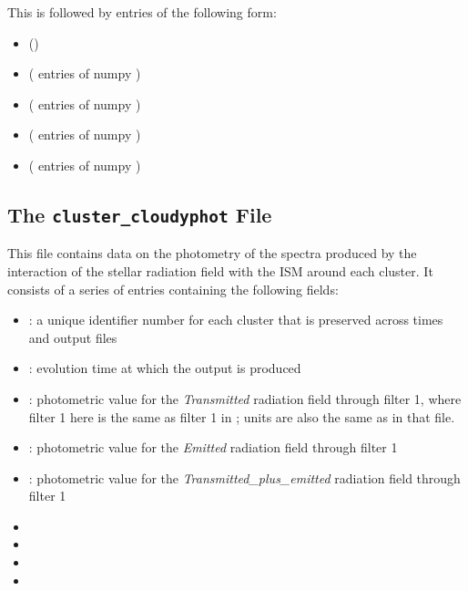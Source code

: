 \documentclass[letterpaper,10pt,english]{sphinxmanual}
\begin{document}
This is followed by  entries of the following form:
\begin{itemize}
\item {} 
 ()

\item {} 
 ( entries of numpy )

\item {} 
 ( entries of numpy )

\item {} 
 ( entries of numpy )

\item {} 
 ( entries of numpy
)

\end{itemize}


\subsection{The \texttt{cluster\_cloudyphot} File}
\label{cloudy:the-cluster-cloudyphot-file}
This file contains data on the photometry of the spectra produced by
the interaction of the stellar radiation field with the ISM around
each cluster. It consists of a series of entries containing the
following fields:
\begin{itemize}
\item {} 
: a unique identifier number for each cluster that is
preserved across times and output files

\item {} 
: evolution time at which the output is produced

\item {} 
: photometric value for the \emph{Transmitted}
radiation field through filter 1, where filter 1 here is the same as
filter 1 in {\hyperref[output:ssec-int-phot-file]{\emph{}}}; units are also the same as
in that file.

\item {} 
: photometric value for the \emph{Emitted}
radiation field through filter 1

\item {} 
: photometric value for the
\emph{Transmitted\_plus\_emitted} radiation field through filter 1

\item {} 

\item {} 

\item {} 

\item {} 

\end{itemize}
\end{document}
